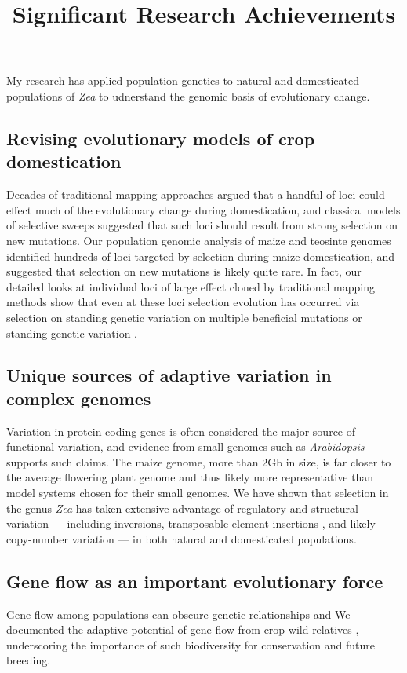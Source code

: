 \documentclass[11pt,letterpaper]{article}
\title{Significant Research Achievements}
\date{}
\begin{document}
\maketitle
\noindent

\noindent My research has applied population genetics to  natural and domesticated populations of \emph{Zea} to udnerstand the genomic basis of evolutionary change.

\subsection*{Revising evolutionary models of crop domestication}
Decades of traditional mapping approaches argued that a handful of loci could effect much of the evolutionary change during domestication, and classical models of selective sweeps  suggested that such loci should result from strong selection on new mutations. 
Our population genomic analysis of maize and teosinte genomes  \citep{hufford2012comparative} identified hundreds of loci targeted by selection during maize domestication, and suggested that selection on new mutations is likely quite rare.
In fact, our detailed looks at individual loci of large effect cloned by traditional mapping methods show that even at these loci selection evolution has occurred via selection on standing genetic variation on multiple beneficial mutations \citep{wills2013many} or standing genetic variation \citep{wills2013many, studer2011identification}.

\subsection*{Unique sources of adaptive variation in complex genomes}
Variation in protein-coding genes is often considered the major source of functional variation, and evidence from small genomes such as \emph{Arabidopsis} \citep[e.g.][]{hancock2011adaptation} supports such claims. 
The maize genome, more than 2Gb in size, is far closer to the average flowering plant genome and thus likely more representative than model systems chosen for their small genomes. 
We have shown that selection in the genus \emph{Zea} has taken extensive advantage of regulatory \citep{swanson2012reshaping,pyhajarvi2013complex} and structural variation --- including inversions\citep{pyhajarvi2013complex,fang2012megabase}, transposable element insertions \citep{studer2011identification,makarevitch2015transposable}, and likely copy-number variation \citep{chia2012maize}	--- in both natural and domesticated populations. 

\subsection*{Gene flow as an important evolutionary force}
Gene flow among populations can obscure genetic relationships and 
We documented the adaptive potential of gene flow from crop wild relatives  \citep{hufford2013genomic,Takuno15062015}, underscoring the importance of such biodiversity for conservation and future breeding.




\end{document}
